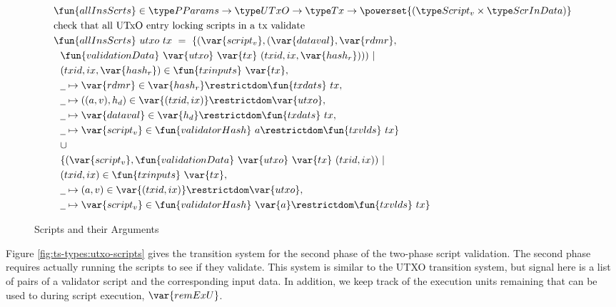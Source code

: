 \begin{figure}[htb]
  \begin{align*}
    & \fun{allInsScrts} \in \PParams \to \UTxO \to \Tx \to \powerset{(\ScriptV\times\ScrInData)} \\
    & \text{check that all UTxO entry locking scripts in a tx validate} \\
    & \fun{allInsScrts}~{utxo}~{tx}~=~ \{ (\var{script_v}, (\var{dataval},\var{rdmr}, \\
    & ~~ \fun{validationData}~\var{utxo}~\var{tx}~
      (txid,ix,\var{hash_r}))) ~\vert \\
    & ~~(txid,ix,\var{hash_r}) \in \fun{txinputs}~\var{tx}, \\
    & ~~\wcard \mapsto \var{rdmr} \in \var{hash_r}\restrictdom \fun{txdats}~{tx}, \\
    & ~~\wcard \mapsto ((a,v),h_d) \in \var{(txid,ix)}\restrictdom\var{utxo}, \\
    & ~~\wcard \mapsto \var{dataval} \in \var{h_d}\restrictdom \fun{txdats}~{tx}, \\
    & ~~\wcard\mapsto \var{script_v}\in \fun{validatorHash}~{a}\restrictdom\fun{txvlds}~{tx} \}\\
    & ~~\cup~ \\
    & ~~\{ (\var{script_v},\fun{validationData}~\var{utxo}~\var{tx}~
      (txid,ix)) ~\vert \\
    & ~~(txid,ix) \in \fun{txinputs}~\var{tx}, \\
    & ~~ \wcard \mapsto (a,v) \in \var{(txid,ix)}\restrictdom\var{utxo}, \\
    & ~~\wcard\mapsto \var{script_v}\in
     \fun{validatorHash}~\var{a}\restrictdom\fun{txvlds}~{tx}\}
  \end{align*}
  \caption{Scripts and their Arguments}
  \label{fig:functions:script3}
\end{figure}

Figure \ref{fig:ts-types:utxo-scripts} gives the transition system for the second phase of
the two-phase script validation. The second phase requires actually running
the scripts to see if they validate. This system is similar to
the UTXO transition system, but signal here is a list of pairs of a validator
script and the corresponding input data. In addition, we keep track of the
execution units remaining that can be used to during script execution, $\var{remExU}$.

